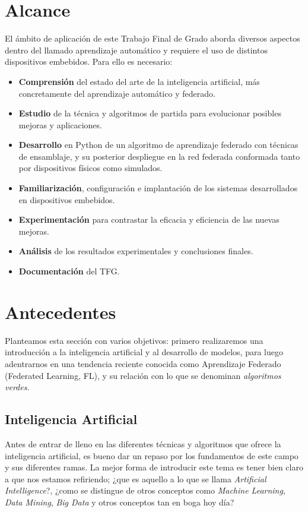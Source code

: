 \documentclass[00-Trabajo_Final.tex]{subfiles}
\begin{document}
\section{Alcance}
El ámbito de aplicación de este Trabajo Final de Grado aborda diversos aspectos dentro del llamado aprendizaje automático y requiere el uso de distintos dispositivos embebidos. Para ello es necesario:
\begin{itemize}[noitemsep]
    \item \textbf{Comprensión} del estado del arte de la inteligencia artificial, más concretamente del aprendizaje automático y federado.
    \item \textbf{Estudio} de la técnica y algoritmos de partida para evolucionar posibles mejoras y aplicaciones.
    \item \textbf{Desarrollo} en Python de un algoritmo de aprendizaje federado con técnicas de ensamblaje, y su posterior despliegue en la red federada conformada tanto por dispositivos físicos como simulados.
    \item \textbf{Familiarización}, configuración e implantación de los sistemas desarrollados en dispositivos embebidos.
    \item \textbf{Experimentación} para contrastar la eficacia y eficiencia de las nuevas mejoras.
    \item \textbf{Análisis} de los resultados experimentales y conclusiones finales.
    \item \textbf{Documentación} del TFG.
\end{itemize}

\newpage

\section{Antecedentes}
Planteamos esta sección con varios objetivos: primero realizaremos una introducción a la inteligencia artificial y al desarrollo de modelos, para luego adentrarnos en una tendencia reciente conocida como Aprendizaje Federado (Federated Learning, FL), y su relación con lo que se denominan \textit{algoritmos verdes}.

\subsection{Inteligencia Artificial}
Antes de entrar de lleno en las diferentes técnicas y algoritmos que ofrece la inteligencia artificial, es bueno dar un repaso por los fundamentos de este campo y sus diferentes ramas. La mejor forma de introducir este tema es tener bien claro a que nos estamos refiriendo; ¿que es aquello a lo que se llama \textit{Artificial Intelligence}?, ¿como se distingue de otros conceptos como \textit{Machine Learning}, \textit{Data Mining}, \textit{Big Data} y otros conceptos tan en boga hoy día?
\end{document}
